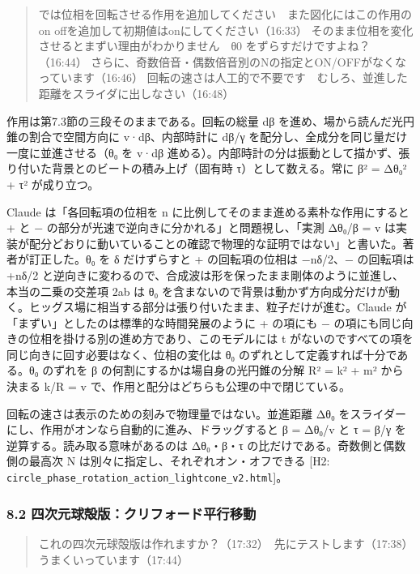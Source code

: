 \documentclass[
  a4paper,
]{ltjsarticle}
\begin{document}
\begin{quote}
では位相を回転させる作用を追加してください　また図化にはこの作用のon
offを追加して初期値はonにしてください（16:33）
そのまま位相を変化させるとまずい理由がわかりません　θ0
をずらすだけですよね？（16:44）
さらに、奇数倍音・偶数倍音別のNの指定とON/OFFがなくなっています（16:46）
回転の速さは人工的で不要です　むしろ、並進した距離をスライダに出しなさい（16:48）
\end{quote}

作用は第7.3節の三段そのままである。回転の総量 dβ
を進め、場から読んだ光円錐の割合で空間方向に v·dβ、内部時計に dβ/γ
を配分し、全成分を同じ量だけ一度に並進させる（θ₀ を v·dβ
進める）。内部時計の分は振動として描かず、張り付いた背景とのビートの積み上げ（固有時
τ）として数える。常に β² = Δθ₀² + τ² が成り立つ。

Claude は「各回転項の位相を n に比例してそのまま進める素朴な作用にすると
+ と − の部分が光速で逆向きに分かれる」と問題視し、「実測 Δθ₀/β = v
は実装が配分どおりに動いていることの確認で物理的な証明ではない」と書いた。著者が訂正した。θ₀
を δ だけずらすと + の回転項の位相は −nδ/2、− の回転項は +nδ/2
と逆向きに変わるので、合成波は形を保ったまま剛体のように並進し、本当の二乗の交差項
2ab は θ₀
を含まないので背景は動かず方向成分だけが動く。ヒッグス場に相当する部分は張り付いたまま、粒子だけが進む。Claude
が「まずい」としたのは標準的な時間発展のように + の項にも −
の項にも同じ向きの位相を掛ける別の進め方であり、このモデルには t
がないのですべての項を同じ向きに回す必要はなく、位相の変化は θ₀
のずれとして定義すれば十分である。θ₀ のずれを β
の何割にするかは場自身の光円錐の分解 R² = k² + m² から決まる k/R = v
で、作用と配分はどちらも公理の中で閉じている。

回転の速さは表示のための刻みで物理量ではない。並進距離 Δθ₀
をスライダーにし、作用がオンなら自動的に進み、ドラッグすると β = Δθ₀/v
と τ = β/γ を逆算する。読み取る意味があるのは Δθ₀・β・τ
の比だけである。奇数側と偶数側の最高次 N
は別々に指定し、それぞれオン・オフできる {[}H2:
\texttt{circle\_\allowbreak{}phase\_\allowbreak{}rotation\_\allowbreak{}action\_\allowbreak{}lightcone\_\allowbreak{}v2.html}{]}。

\subsubsection{8.2
四次元球殻版：クリフォード平行移動}\label{ux56dbux6b21ux5143ux7403ux6bbbux7248ux30afux30eaux30d5ux30a9ux30fcux30c9ux5e73ux884cux79fbux52d5}

\begin{quote}
これの四次元球殻版は作れますか？（17:32）　先にテストします（17:38）　うまくいっています（17:44）
\end{quote}
\end{document}
